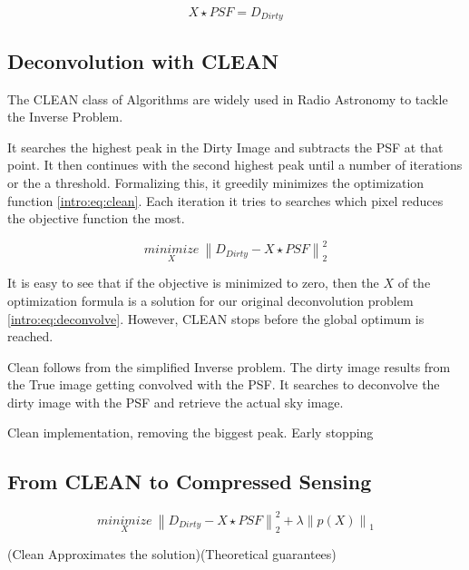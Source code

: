 \begin{equation}\label{intro:eq:deconvolve}
X \star PSF = D_{Dirty} 
\end{equation}

\subsection{Deconvolution with CLEAN}
The CLEAN class of Algorithms\cite{hogbom1974aperture}\cite{schwab1984relaxing}\cite{rich2008multi}\cite{rau2011multi} are widely used in Radio Astronomy to tackle the Inverse Problem. 

It searches the highest peak in the Dirty Image and subtracts the PSF at that point. It then continues with the second highest peak until a number of iterations or the a threshold. Formalizing this, it greedily minimizes the optimization function \eqref{intro:eq:clean}. Each iteration it tries to searches which pixel reduces the objective function the most.

\begin{equation}\label{intro:eq:clean}
\underset{X}{minimize} \: \left \| D_{Dirty} - X \star PSF \right \|_2^2
\end{equation}

It is easy to see that if the objective is minimized to zero, then the $X$ of the optimization formula is a solution for our original deconvolution problem \eqref{intro:eq:deconvolve}. However, CLEAN stops before the global optimum is reached.


Clean follows from the simplified Inverse problem. The dirty image results from the True image getting convolved with the PSF. It searches to deconvolve the dirty image with the PSF and retrieve the actual sky image.

Clean implementation, removing the biggest peak. Early stopping


\subsection{From CLEAN to Compressed Sensing}


\begin{equation}\label{intro:eq:clean}
\underset{X}{minimize} \: \left \| D_{Dirty} - X \star PSF \right \|_2^2 + \lambda \left \| p(X) \right \|_1
\end{equation}




(Clean Approximates the solution)(Theoretical guarantees)

